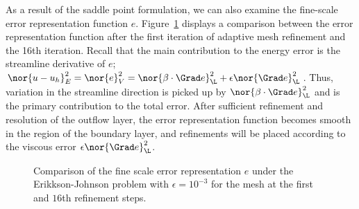 As a result of the saddle point formulation, we can also examine the fine-scale error representation function $e$.  Figure~\ref{fig:erikksonError} displays a comparison between the error representation function after the first iteration of adaptive mesh refinement and the 16th iteration.  Recall that the main contribution to the energy error is the streamline derivative of $e$; $\nor{u-u_h}_E^2 = \nor{e}_V^2 = \nor{\beta \cdot \Grad e}_{\L}^2 + \epsilon\nor{\Grad e}_{\L}^2$. Thus, variation in the streamline direction is picked up by $\nor{\beta\cdot \Grad e}_{\L}^2$ and is the primary contribution to the total error.  After sufficient refinement and resolution of the outflow layer, the error representation function becomes smooth in the region of the boundary layer, and refinements will be placed according to the viscous error $\epsilon\nor{\Grad e}_{\L}^2$. 

\begin{figure}[!h]
\centering
{}
\caption{Comparison of the fine scale error representation $e$ under the Erikkson-Johnson problem with $\epsilon = 10^{-3}$ for the mesh at the first and $16$th refinement steps.}
\label{fig:erikksonError}
\end{figure}

